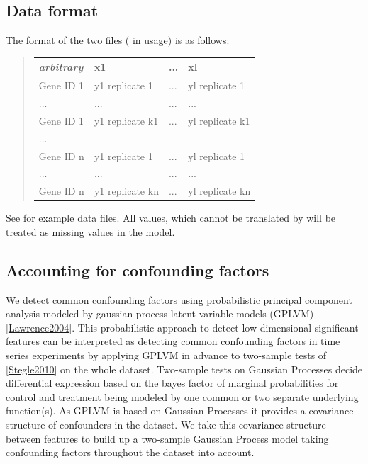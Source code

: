 \documentclass[letterpaper,10pt,english]{sphinxmanual}
\begin{document}
\subsection{Data format}
\label{usage:dataformat}\label{usage:data-format}
The format of the two  files ( in usage) is as follows:
\begin{quote}

\begin{tabulary}{\linewidth}{|L|L|L|L|}
\hline
\textbf{
\emph{arbitrary}
} & \textbf{
x1
} & \textbf{
...
} & \textbf{
xl
}\\\hline

Gene ID 1
 & 
y1 replicate 1
 & 
...
 & 
yl replicate 1
\\\hline

...
 & 
...
 & 
...
 & 
...
\\\hline

Gene ID 1
 & 
y1 replicate k1
 & 
...
 & 
yl replicate k1
\\\hline

...
 &  &  & \\\hline

Gene ID n
 & 
y1 replicate 1
 & 
...
 & 
yl replicate 1
\\\hline

...
 & 
...
 & 
...
 & 
...
\\\hline

Gene ID n
 & 
y1 replicate kn
 & 
...
 & 
yl replicate kn
\\\hline
\end{tabulary}

\end{quote}

See \code{gptwosample/examples/ToyCondition\{1,2{]}.csv} for example data files.
All values, which cannot be translated by  will be
treated as missing values in the model.


\subsection{Accounting for confounding factors}
\label{confounders:accounting-for-confounding-factors}\label{confounders::doc}\label{confounders:confounders}
We detect common confounding factors using probabilistic principal component
analysis modeled by gaussian process latent variable models (GPLVM)
{\hyperref[confounders:lawrence2004]{{[}Lawrence2004{]}}}. This probabilistic approach to detect low
dimensional significant features can be interpreted as detecting
common confounding factors in time series experiments by applying
GPLVM in advance to two-sample tests of {\hyperref[confounders:stegle2010]{{[}Stegle2010{]}}} on the
whole dataset. Two-sample tests on Gaussian Processes decide
differential expression based on the bayes factor of marginal probabilities
for control and treatment being modeled by one common or two separate
underlying function(s). As GPLVM is based on Gaussian Processes it
provides a covariance structure of confounders in the dataset. We take
this covariance structure between features to build up a two-sample
Gaussian Process model taking confounding factors throughout the
dataset into account.
\end{document}
